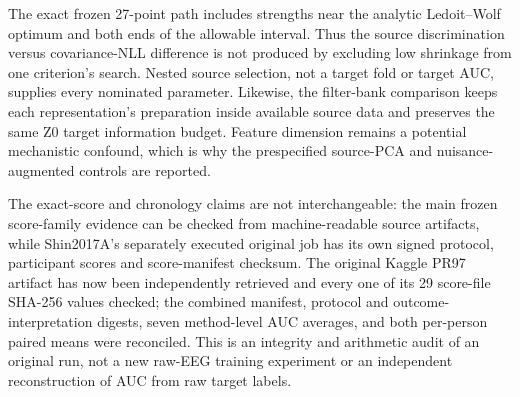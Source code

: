 The exact frozen 27-point path includes strengths near the
analytic Ledoit--Wolf optimum and both ends of the allowable
interval. Thus the source discrimination versus covariance-NLL
difference is not produced by excluding low shrinkage from one
criterion's search. Nested source selection, not a target fold
or target AUC, supplies every nominated parameter. Likewise,
the filter-bank comparison keeps each representation's preparation
inside available source data and preserves the same Z0 target
information budget. Feature dimension remains a potential
mechanistic confound, which is why the prespecified source-PCA
and nuisance-augmented controls are reported.

The exact-score and chronology claims are not interchangeable:
the main frozen score-family evidence can be checked from
machine-readable source artifacts, while Shin2017A's separately
executed original job has its own signed protocol, participant
scores and score-manifest checksum. The original Kaggle PR97 artifact has now been independently
retrieved and every one of its 29 score-file SHA-256 values checked;
the combined manifest, protocol and outcome-interpretation digests,
seven method-level AUC averages, and both per-person paired means
were reconciled. This is an integrity and arithmetic audit of
an original run, not a new raw-EEG training experiment or an
independent reconstruction of AUC from raw target labels.
